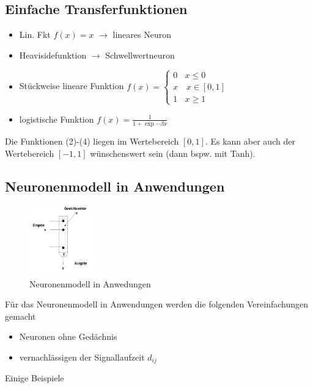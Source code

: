 \subsection{Einfache Transferfunktionen}
\begin{itemize}
    \item Lin. Fkt $f(x) = x$ $\rightarrow$ lineares Neuron
    \item Heavisidefunktion $\rightarrow$ Schwellwertneuron
    \item Stückweise lineare Funktion $f (x) = \left\{
                                        \begin{array}{ll}
                                        0 & x \leq 0 \\
                                        x & \, x\in[0,1] \\
                                        1 & x\geq 1
                                        \end{array}
                                        \right. $
    \item logistische Funktion $f(x) = \frac{1}{1+\exp{-\beta x}}$                         
\end{itemize}

Die Funktionen (2)-(4) liegen im Wertebereich $[0,1]$. Es kann aber auch der Wertebereich $[-1,1]$ wünschenswert sein (dann bspw. mit Tanh).

\subsection{Neuronenmodell in Anwendungen}
\begin{figure}[h]
    \centering
    \includegraphics[width=0.25\textwidth]{img/BiologischesModell/NeuronenmodellAnwedung.png}
    \caption{Neuronenmodell in Anwedungen}
    \label{ch_bio_nmAnwendung}
\end{figure}

Für das Neuronenmodell in Anwendungen werden die folgenden Vereinfachungen gemacht
\begin{itemize}
    \item Neuronen ohne Gedächnis
    \item vernachlässigen der Signallaufzeit $d_{ij}$
\end{itemize}
Einige Beispiele

